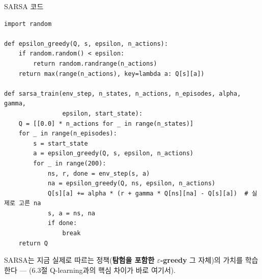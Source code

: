 \begin{frame}[fragile,shrink=14]{SARSA 코드}
\begin{lstlisting}
import random

def epsilon_greedy(Q, s, epsilon, n_actions):
    if random.random() < epsilon:
        return random.randrange(n_actions)
    return max(range(n_actions), key=lambda a: Q[s][a])

def sarsa_train(env_step, n_states, n_actions, n_episodes, alpha, gamma,
                epsilon, start_state):
    Q = [[0.0] * n_actions for _ in range(n_states)]
    for _ in range(n_episodes):
        s = start_state
        a = epsilon_greedy(Q, s, epsilon, n_actions)
        for _ in range(200):
            ns, r, done = env_step(s, a)
            na = epsilon_greedy(Q, ns, epsilon, n_actions)
            Q[s][a] += alpha * (r + gamma * Q[ns][na] - Q[s][a])  # 실제로 고른 na
            s, a = ns, na
            if done:
                break
    return Q
\end{lstlisting}
  SARSA는 지금 실제로 따르는 정책(\textbf{탐험을 포함한 $\varepsilon$-greedy}
  그 자체)의 가치를 학습한다 --- 
  (6.3절 Q-learning과의 핵심 차이가 바로 여기서).
\end{frame}
